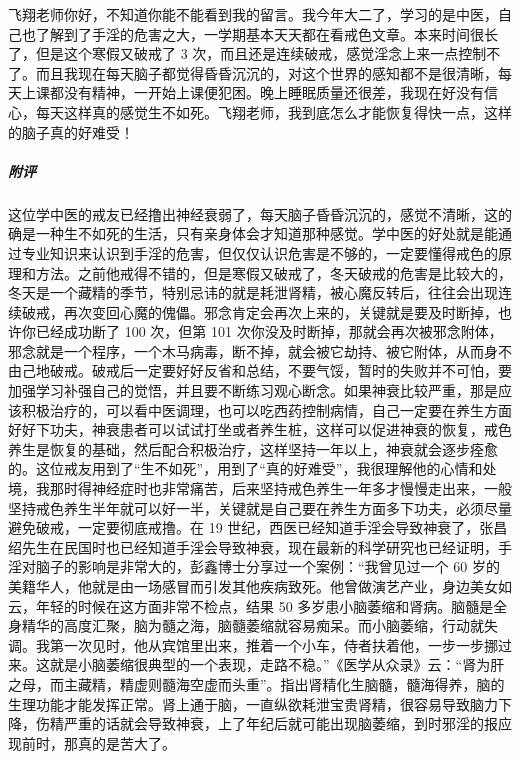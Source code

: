 \begin{case}
    飞翔老师你好，不知道你能不能看到我的留言。我今年大二了，学习的是中医，自己也了解到了手淫的危害之大，一学期基本天天都在看戒色文章。本来时间很长了，但是这个寒假又破戒了 3 次，而且还是连续破戒，感觉淫念上来一点控制不了。而且我现在每天脑子都觉得昏昏沉沉的，对这个世界的感知都不是很清晰，每天上课都没有精神，一开始上课便犯困。晚上睡眠质量还很差，我现在好没有信心，每天这样真的感觉生不如死。飞翔老师，我到底怎么才能恢复得快一点，这样的脑子真的好难受！
    \subparagraph{附评} 这位学中医的戒友已经撸出神经衰弱了，每天脑子昏昏沉沉的，感觉不清晰，这的确是一种生不如死的生活，只有亲身体会才知道那种感觉。学中医的好处就是能通过专业知识来认识到手淫的危害，但仅仅认识危害是不够的，一定要懂得戒色的原理和方法。之前他戒得不错的，但是寒假又破戒了，冬天破戒的危害是比较大的，冬天是一个藏精的季节，特别忌讳的就是耗泄肾精，被心魔反转后，往往会出现连续破戒，再次变回心魔的傀儡。邪念肯定会再次上来的，关键就是要及时断掉，也许你已经成功断了 100 次，但第 101 次你没及时断掉，那就会再次被邪念附体，邪念就是一个程序，一个木马病毒，断不掉，就会被它劫持、被它附体，从而身不由己地破戒。破戒后一定要好好反省和总结，不要气馁，暂时的失败并不可怕，要加强学习补强自己的觉悟，并且要不断练习观心断念。如果神衰比较严重，那是应该积极治疗的，可以看中医调理，也可以吃西药控制病情，自己一定要在养生方面好好下功夫，神衰患者可以试试打坐或者养生桩，这样可以促进神衰的恢复，戒色养生是恢复的基础，然后配合积极治疗，这样坚持一年以上，神衰就会逐步痊愈的。这位戒友用到了“生不如死”，用到了“真的好难受”，我很理解他的心情和处境，我那时得神经症时也非常痛苦，后来坚持戒色养生一年多才慢慢走出来，一般坚持戒色养生半年就可以好一半，关键就是自己要在养生方面多下功夫，必须尽量避免破戒，一定要彻底戒撸。在 19 世纪，西医已经知道手淫会导致神衰了，张昌绍先生在民国时也已经知道手淫会导致神衰，现在最新的科学研究也已经证明，手淫对脑子的影响是非常大的，彭鑫博士分享过一个案例：“我曾见过一个 60 岁的美籍华人，他就是由一场感冒而引发其他疾病致死。他曾做演艺产业，身边美女如云，年轻的时候在这方面非常不检点，结果 50 多岁患小脑萎缩和肾病。脑髓是全身精华的高度汇聚，脑为髓之海，脑髓萎缩就容易痴呆。而小脑萎缩，行动就失调。我第一次见时，他从宾馆里出来，推着一个小车，侍者扶着他，一步一步挪过来。这就是小脑萎缩很典型的一个表现，走路不稳。”《医学从众录》云：“肾为肝之母，而主藏精，精虚则髓海空虚而头重”。指出肾精化生脑髓，髓海得养，脑的生理功能才能发挥正常。肾上通于脑，一直纵欲耗泄宝贵肾精，很容易导致脑力下降，伤精严重的话就会导致神衰，上了年纪后就可能出现脑萎缩，到时邪淫的报应现前时，那真的是苦大了。
\end{case}

